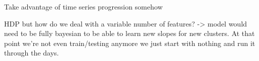 Take advantage of time series progression somehow

HDP but how do we deal with a variable number of features? -> model would need to be fully bayesian to be able to learn new slopes for new clusters. At that point we're not even train/testing anymore we just start with nothing and run it through the days.